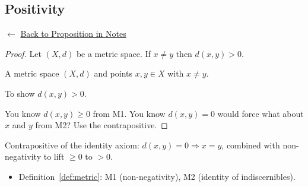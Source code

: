 
\subsection*{Positivity}
\label{prf:positivity}

\begin{remark*}[Return]
$\leftarrow$ \hyperref[prop:positivity]{Back to Proposition in Notes}
\end{remark*}

\begin{proof}
\Claim Let $(X,d)$ be a metric space. If $x \neq y$ then $d(x,y) > 0$.

\Given A metric space $(X,d)$ and points $x, y \in X$ with $x \neq y$.

\Goal To show $d(x,y) > 0$.

\Strategy You know $d(x,y) \ge 0$ from M1. You know $d(x,y) = 0$ would force
what about $x$ and $y$ from M2? Use the contrapositive.


\end{proof}

\begin{remark*}
Contrapositive of the identity axiom: $d(x,y) = 0 \Rightarrow x = y$,
combined with non-negativity to lift $\ge 0$ to $> 0$.
\end{remark*}

\begin{remark*}[Dependencies]
\begin{itemize}
  \item Definition~\ref{def:metric}: M1 (non-negativity), M2 (identity of indiscernibles).
\end{itemize}
\end{remark*}
